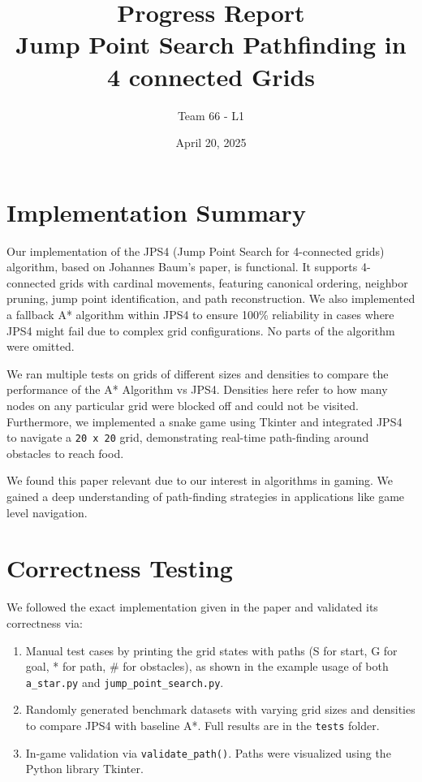 \documentclass[11pt]{article}
\title{Progress Report \\ \textbf{Jump Point Search Pathfinding in 4 connected Grids}}
\author{Team 66 - L1}
\date{April 20, 2025}
\begin{document}
\maketitle

\section{Implementation Summary}

Our implementation of the JPS4 (Jump Point Search for 4-connected grids) algorithm, based on Johannes Baum's paper, is functional. It supports 4-connected grids with cardinal movements, featuring canonical ordering, neighbor pruning, jump point identification, and path reconstruction. We also implemented a fallback A* algorithm within JPS4 to ensure 100\% reliability in cases where JPS4 might fail due to complex grid configurations. No parts of the algorithm were omitted. 

We ran multiple tests on grids of different sizes and densities to compare the performance of the A* Algorithm vs JPS4. Densities here refer to how many nodes on any particular grid were blocked off and could not be visited. Furthermore, we implemented a snake game using Tkinter and integrated JPS4 to navigate a \texttt{20 x 20} grid, demonstrating real-time path-finding around obstacles to reach food.

We found this paper relevant due to our interest in algorithms in gaming. We gained a deep understanding of path-finding strategies in applications like game level navigation.

\section{Correctness Testing}

We followed the exact implementation given in the paper and validated its correctness via:

\begin{enumerate}
    \item Manual test cases by printing the grid states with paths (S for start, G for goal, * for path, \# for obstacles), as shown in the example usage of both \texttt{a\_star.py} and \texttt{jump\_point\_search.py}.
    \item Randomly generated benchmark datasets with varying grid sizes and densities to compare JPS4 with baseline A*. Full results are in the \texttt{tests} folder.
    \item In-game validation via \texttt{validate\_path()}. Paths were visualized using the Python library Tkinter.
\end{enumerate}
\end{document}
